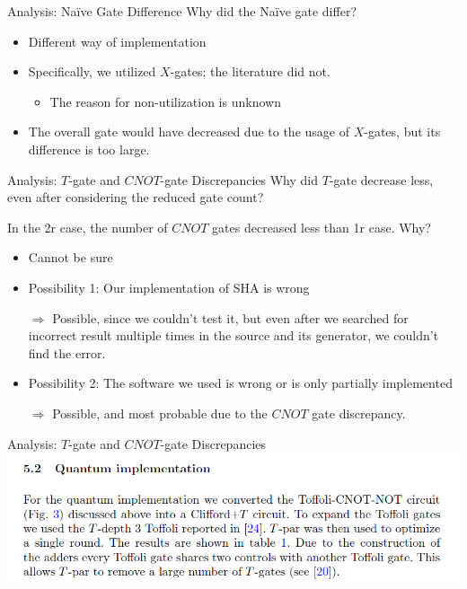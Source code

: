 \documentclass{beamer}
\begin{document}
    \begin{frame}{Analysis: Na\"ive Gate Difference}
    	Why did the Na\"ive gate differ?
    	\begin{itemize}
    		\item Different way of implementation
    		\item Specifically, we utilized $X$-gates; the literature did not.
    		\begin{itemize}
    			\item The reason for non-utilization is unknown
    		\end{itemize}
    		\item The overall gate would have decreased due to the usage of $X$-gates, but its difference is too large.
    	\end{itemize}
    \end{frame}
  	
  	\begin{frame}{Analysis: $T$-gate and $CNOT$-gate Discrepancies}
  		Why did $T$-gate decrease less, even after considering the reduced gate count?
  		
  		In the 2r case, the number of $CNOT$ gates decreased less than 1r case. Why?
  		\begin{itemize}
  			\item Cannot be sure
  			\item Possibility 1: Our implementation of SHA is wrong
  			\item[$\Rightarrow$] Possible, since we couldn't test it, but even after we searched for incorrect result multiple times in the source and its generator, we couldn't find the error.
  			\item Possibility 2: The software we used is wrong or is only partially implemented
  			\item[$\Rightarrow$] Possible, and most probable due to the $CNOT$ gate discrepancy.
  		\end{itemize}
  	\end{frame}
  	
  	\begin{frame}{Analysis: $T$-gate and $CNOT$-gate Discrepancies}
  		\includegraphics[width=\textwidth]{./Images/opt-diff.png}
  	\end{frame}
\end{document}
